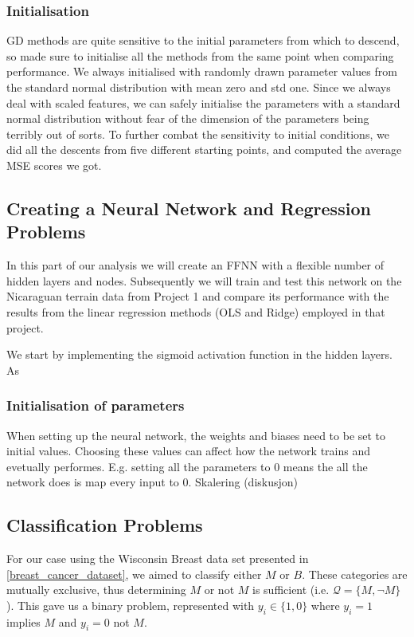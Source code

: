     \subsubsection{Initialisation}
        GD methods are quite sensitive to the initial parameters from which to descend, so made sure to initialise all the methods from the same point when comparing performance. We always initialised with randomly drawn parameter values from the standard normal distribution with mean zero and std one. Since we always deal with scaled features, we can safely initialise the parameters with a standard normal distribution without fear of the dimension of the parameters being terribly out of sorts. To further combat the sensitivity to initial conditions, we did all the descents from five different starting points, and computed the average MSE scores we got.

\subsection{Creating a Neural Network and Regression Problems}
    In this part of our analysis we will create an FFNN with a flexible number of hidden layers and nodes. Subsequently we will train and test this network on the Nicaraguan terrain data from Project 1 and compare its performance with the results from the linear regression methods (OLS and Ridge) employed in that project. 


    We start by implementing the sigmoid activation function in the hidden layers. As 

    \subsubsection{Initialisation of parameters}
        When setting up the neural network, the weights and biases need to be set to initial values. Choosing these values can affect how the network trains and evetually performes. E.g. setting all the parameters to $0$ means the all the network does is map every input to $0$. Skalering (diskusjon)

    
\subsection{Classification Problems}
    For our case using the Wisconsin Breast data set presented in \cref{breast_cancer_dataset}, we aimed to classify either $M$ or $B$. These categories are mutually exclusive, thus determining $M$ or not $M$ is sufficient (i.e. $\mathcal{Q} = \{ M, \neg M \}$). This gave us a binary problem, represented with $y_i \in \{ 1, 0 \}$ where $y_i = 1$ implies $M$ and $y_i = 0$ not $M$.

